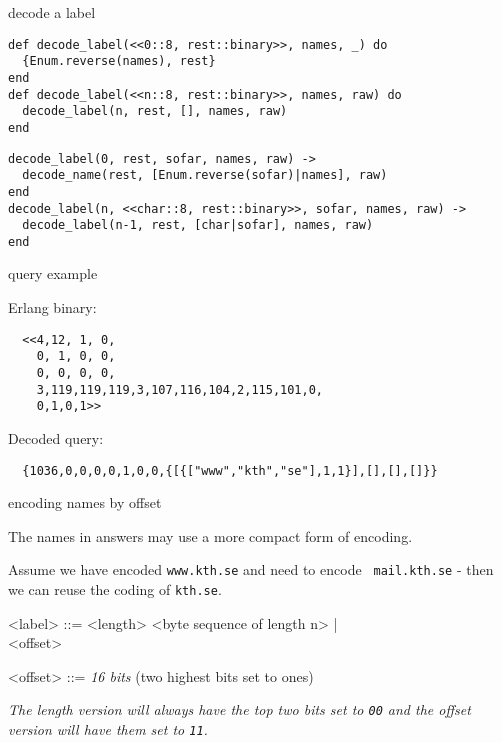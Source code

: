 \begin{frame}[fragile]{decode a label}

\begin{verbatim}
def decode_label(<<0::8, rest::binary>>, names, _) do
  {Enum.reverse(names), rest}
end
def decode_label(<<n::8, rest::binary>>, names, raw) do
  decode_label(n, rest, [], names, raw)
end
\end{verbatim}

\vspace{20pt}\pause

\begin{verbatim}
decode_label(0, rest, sofar, names, raw) ->
  decode_name(rest, [Enum.reverse(sofar)|names], raw)
end
decode_label(n, <<char::8, rest::binary>>, sofar, names, raw) ->
  decode_label(n-1, rest, [char|sofar], names, raw)
end
\end{verbatim}

\end{frame}

\begin{frame}[fragile]{query example}

  Erlang binary:
\begin{verbatim}
  <<4,12, 1, 0,
    0, 1, 0, 0,
    0, 0, 0, 0,
    3,119,119,119,3,107,116,104,2,115,101,0,
    0,1,0,1>>
\end{verbatim}

\vspace{20pt} \pause
  Decoded query:
\begin{verbatim}
  {1036,0,0,0,0,1,0,0,{[{["www","kth","se"],1,1}],[],[],[]}}
\end{verbatim}  

\end{frame}

\begin{frame}{encoding names by offset}

The names in answers may use a more compact form of encoding.  

\vspace{20pt}\pause

Assume we have encoded {\tt www.kth.se} and need to encode {\tt
  mail.kth.se} - then we can reuse the coding of {\tt kth.se}.

\vspace{20pt} \pause

\begin{grammar}
<label> ::=  <length> <byte sequence of length n> | \\
             <offset>

<offset> ::= {\em 16 bits} (two highest bits set to ones)

\end{grammar}


\vspace{20pt} \pause


{\em The length version will always have the top two bits set to {\tt 00} and the offset version will have them set to {\tt 11}.}

\end{frame}

